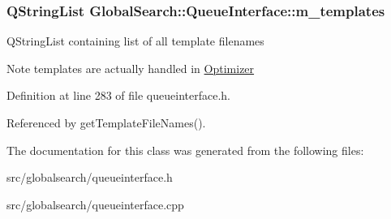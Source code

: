 \subsubsection[{m\+\_\+templates}]{\setlength{\rightskip}{0pt plus 5cm}Q\+String\+List Global\+Search\+::\+Queue\+Interface\+::m\+\_\+templates\hspace{0.3cm}{\ttfamily [protected]}}\label{classGlobalSearch_1_1QueueInterface_afbece4079dfba7a2cf11c32153c777a7}
Q\+String\+List containing list of all template filenames \begin{DoxyNote}{Note}
templates are actually handled in \hyperlink{classGlobalSearch_1_1Optimizer}{Optimizer} 
\end{DoxyNote}


Definition at line 283 of file queueinterface.\+h.



Referenced by get\+Template\+File\+Names().



The documentation for this class was generated from the following files\+:\begin{DoxyCompactItemize}
\item 
src/globalsearch/queueinterface.\+h\item 
src/globalsearch/queueinterface.\+cpp\end{DoxyCompactItemize}
